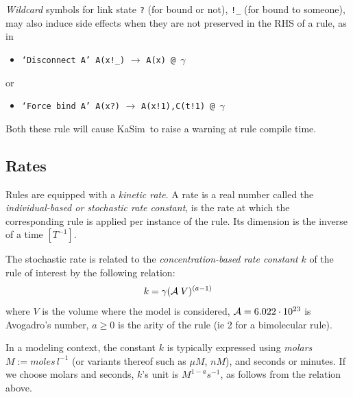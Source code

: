 \documentclass[11pt]{book}
\def\KaSim{\textsf{KaSim}}
\def\ttt#1{\texttt{#1}}
\def\rar{\rightarrow}
\def\ga{\gamma}
\def\ie{ie }
\def\ITE#1{\begin{itemize}#1\end{itemize}}
\def\mit#1{{\mathit #1}}
\begin{document}
\emph{Wildcard} symbols for link state \ttt{?} (for bound or not), \ttt{!\_} (for bound to someone), may also induce side effects when they are not preserved in the RHS of a rule, as in
\ITE{
\item[] \ttt{`Disconnect A' A(x!\_)} $\rar$ \ttt{A(x) @ $\ga$} 
}
or 
\ITE{
\item[] \ttt{`Force bind A' A(x?)} $\rar$ \ttt{A(x!1),C(t!1) @ $\ga$} 
}
Both these rule will cause \KaSim~to raise a warning at rule compile time.

\subsection{Rates}\label{sec:kinetics}
Rules are equipped with a \emph{kinetic rate}. A rate is a real number called the \emph{individual-based or stochastic rate constant}, is the rate at which the corresponding rule is applied per instance of the rule. Its dimension is the inverse of a time $[T^{-1}]$.

The stochastic rate is related to the \emph{concentration-based rate constant} $k$ of the rule of interest by the following relation:
%
%
\begin{equation}\label{stochrate}
k = \ga{({\cal A}\; V)^{(a-1)}} %
\end{equation}
where 
$V$ is the volume where the model is considered,
${\cal A}= 6.022\cdot 10^{23}$ is Avogadro's number, %
$a\geq0$ is the arity of the rule (\ie 2 for a bimolecular rule).

In a modeling context, the constant $k$ is typically expressed using \emph{molars} $M:=\mit{moles}\,l^{-1}$ (or variants thereof such
as $\mu M$, $nM$), and seconds or minutes. If we choose molars and seconds, $k$'s unit is $\mathit{M}^{1-a}\mathit{s}^{-1}$, as 
follows from the relation above.
\end{document}
